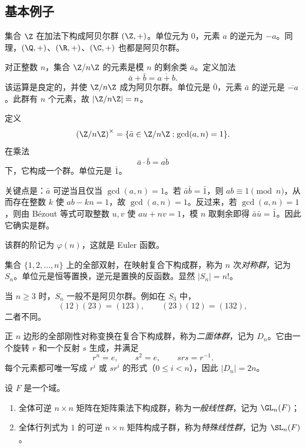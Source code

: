 \subsection*{基本例子}

\begin{example}[整数加法群]
集合 $\Z$ 在加法下构成阿贝尔群 $(\Z,+)$。单位元为 $0$，元素 $a$ 的逆元为 $-a$。同理，$(\Q,+)$、$(\R,+)$、$(\C,+)$ 也都是阿贝尔群。
\end{example}

\begin{example}[模 $n$ 剩余类加法群]
对正整数 $n$，集合 $\Z/n\Z$ 的元素是模 $n$ 的剩余类 $\bar a$。定义加法
\[
\bar a+\bar b=\overline{a+b}.
\]
该运算是良定的，并使 $\Z/n\Z$ 成为阿贝尔群。单位元是 $\bar 0$，元素 $\bar a$ 的逆元是 $\overline{-a}$。此群有 $n$ 个元素，故 $|\Z/n\Z|=n$。
\end{example}

\begin{example}[模 $n$ 可逆剩余类群]
定义
\[
\left(\Z/n\Z\right)^\times=\{\bar a \in \Z/n\Z: \gcd(a,n)=1\}.
\]
在乘法
\[
\bar a\cdot\bar b=\overline{ab}
\]
下，它构成一个群。单位元是 $\bar 1$。

关键点是：$\bar a$ 可逆当且仅当 $\gcd(a,n)=1$。若 $\bar a\bar b=\bar 1$，则 $ab\equiv 1 \pmod n$，从而存在整数 $k$ 使 $ab-kn=1$，故 $\gcd(a,n)=1$。反过来，若 $\gcd(a,n)=1$，则由 Bézout 等式可取整数 $u,v$ 使 $au+nv=1$，模 $n$ 取剩余即得 $\bar a\bar u=\bar 1$。因此它确实是群。

该群的阶记为 $\varphi(n)$，这就是 Euler 函数。
\end{example}

\begin{example}[对称群 $S_n$]
集合 $\{1,2,\dots,n\}$ 上的全部双射，在映射复合下构成群，称为 $n$ 次\emph{对称群}，记为 $S_n$。单位元是恒等置换，逆元是置换的反函数。显然 $|S_n|=n!$。

当 $n\ge 3$ 时，$S_n$ 一般不是阿贝尔群。例如在 $S_3$ 中，
\[
(12)(23)=(123), \qquad (23)(12)=(132),
\]
二者不同。
\end{example}

\begin{example}[二面体群 $D_n$]
正 $n$ 边形的全部刚性对称变换在复合下构成群，称为\emph{二面体群}，记为 $D_n$。它由一个旋转 $r$ 和一个反射 $s$ 生成，并满足
\[
 r^n=e, \qquad s^2=e, \qquad srs=r^{-1}.
\]
每个元素都可唯一写成 $r^i$ 或 $sr^i$ 的形式（$0\le i<n$），因此 $|D_n|=2n$。
\end{example}

\begin{example}[矩阵群]
设 $F$ 是一个域。
\begin{enumerate}[label=\textnormal{(\arabic*)}, leftmargin=3em]
  \item 全体可逆 $n\times n$ 矩阵在矩阵乘法下构成群，称为\emph{一般线性群}，记为 $\GL_n(F)$；
  \item 全体行列式为 $1$ 的可逆 $n\times n$ 矩阵构成子群，称为\emph{特殊线性群}，记为 $\SL_n(F)$。
\end{enumerate}
\end{example}

